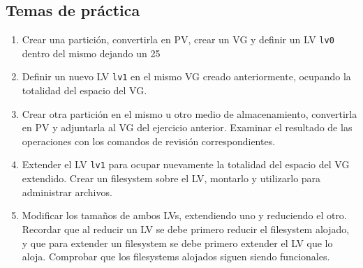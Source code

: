 \subsection{Temas de práctica}
\begin{enumerate}
	\item Crear una partición, convertirla en PV, crear un VG y definir un LV \lstinline{lv0} dentro del mismo dejando un 25%
	\item Definir un nuevo LV \lstinline{lv1} en el mismo VG creado anteriormente, ocupando la totalidad del espacio del VG.
	\item Crear otra partición en el mismo u otro medio de almacenamiento, convertirla en PV y adjuntarla al VG del ejercicio anterior. Examinar el resultado de las operaciones con los comandos de revisión correspondientes. 
	\item Extender el LV \lstinline{lv1} para ocupar nuevamente la totalidad del espacio del VG extendido. Crear un filesystem sobre el LV, montarlo y utilizarlo para administrar archivos.
	\item Modificar los tamaños de ambos LVs, extendiendo uno y reduciendo el otro. Recordar que al reducir un LV se debe primero reducir el filesystem alojado, y que para extender un filesystem se debe primero extender el LV que lo aloja. Comprobar que los filesystems alojados siguen siendo funcionales.
\end{enumerate}